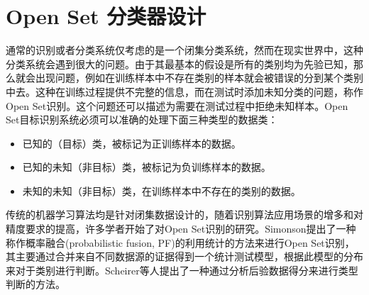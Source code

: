 \section{Open Set 分类器设计}
\label{sec:sei_method}
通常的识别或者分类系统仅考虑的是一个闭集分类系统，然而在现实世界中，这种分类系统会遇到很大的问题。由于其最基本的假设是所有的类别均为先验已知，那么就会出现问题，例如在训练样本中不存在类别的样本就会被错误的分到某个类别中去。这种在训练过程提供不完整的信息，而在测试时添加未知分类的问题，称作Open Set识别。这个问题还可以描述为需要在测试过程中拒绝未知样本。Open Set目标识别系统必须可以准确的处理下面三种类型的数据类：
\begin{itemize}
	\item 已知的（目标）类，被标记为正训练样本的数据。
	\item 已知的未知（非目标）类，被标记为负训练样本的数据。
	\item 未知的未知（非目标）类，在训练样本中不存在的类别的数据。
\end{itemize}
传统的机器学习算法均是针对闭集数据设计的，随着识别算法应用场景的增多和对精度要求的提高，许多学者开始了对Open Set识别的研究。Simonson提出了一种称作概率融合(probabilistic fusion, PF)的利用统计的方法来进行Open Set识别，其主要通过合并来自不同数据源的证据得到一个统计测试模型，根据此模型的分布来对于类别进行判断。Scheirer等人提出了一种通过分析后验数据得分来进行类型判断的方法。

